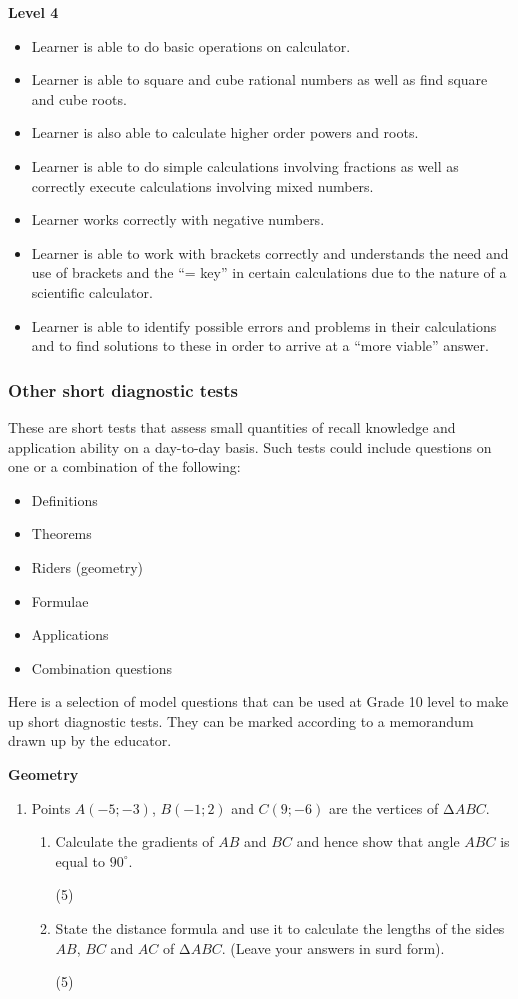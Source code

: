 \textbf{Level 4}\begin{itemize}[noitemsep]
\item Learner is able to do basic operations on calculator.
\item Learner is able to square and cube rational numbers as well as find square and cube roots.
\item Learner is also able to calculate higher order powers and roots.
\item Learner is able to do simple calculations involving fractions as well as correctly execute calculations involving mixed numbers.
\item Learner works correctly with negative numbers.
\item Learner is able to work with brackets correctly and understands the need and use of brackets and the “= key” in certain calculations due to the nature of a scientific calculator.
\item Learner is able to identify possible errors and problems in their calculations and to find solutions to these in order to arrive at a “more viable” answer.
\end{itemize}

\subsubsection{Other short diagnostic tests }
These are short tests that assess small quantities of recall knowledge and application ability on a day-to-day basis. Such tests could include questions on one or a combination of the following:
\begin{itemize}[noitemsep]
\item Definitions
\item Theorems
\item Riders (geometry)
\item Formulae
\item Applications
\item Combination questions
\end{itemize}
Here is a selection of model questions that can be used at Grade 10 level to make up short diagnostic tests. They can be marked according to a memorandum drawn up by the educator. \par
\textbf{Geometry}
\begin{enumerate}[itemsep=0pt, label=\textbf{\arabic*}. ] 
\item Points $A(-5 ; -3)$, $B (-1 ; 2)$ and $C (9 ; -6)$ are the vertices of $∆ABC$. 
\begin{enumerate}[itemsep=0pt,label=\textbf{(\alph*)}]
\item Calculate the gradients of $AB$ and $BC$ and hence show that angle $ABC$ is 
equal to $90^{\circ}$.				
\begin{flushright}(5)\end{flushright}
\item State the distance formula and use it to calculate the lengths of the sides 
$AB$, $BC$ and $AC$ of $∆ABC$. (Leave your answers in surd form). 
\begin{flushright}(5)\end{flushright}
\end{enumerate}
\end{enumerate}

